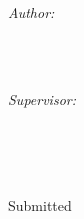 \begin{titlepage}
    
    \begin{minipage}[t]{0.45\textwidth}
    \begin{flushleft} \large
    \emph{Author:}\\
    \@author \\ %
    \cid
    \end{flushleft}
    \end{minipage}
    ~
    \begin{minipage}[t]{0.45\textwidth}
    \begin{flushright} \large
    \emph{Supervisor:} \\
    \supervisor \\ %
    \cosupervisor \\[1.2em]
    \end{flushright}
    \end{minipage}\\[2cm]
    \makeatother
    
    
    \vspace{3em}
    {\large Submitted \\ }\\[2cm] %
    \vspace{1em}
    {\large {}}
    
    \vfill %
    
    \end{titlepage}